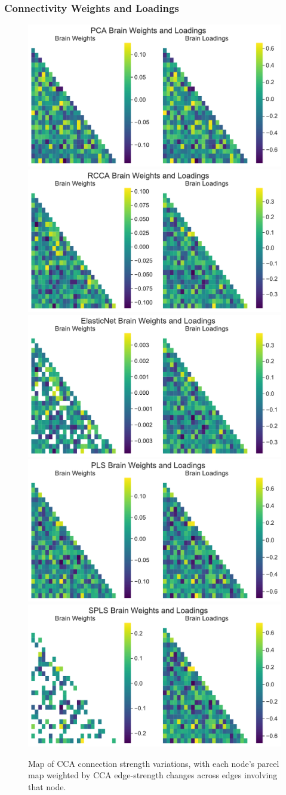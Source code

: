 \subsubsection{Connectivity Weights and Loadings}
\begin{figure}
\centering
\includegraphics[width=0.55\linewidth]{figures/regularization/hcp/PCA brain weights and loadings.pdf}
\includegraphics[width=0.55\linewidth]{figures/regularization/hcp/RCCA brain weights and loadings.pdf}
\includegraphics[width=0.55\linewidth]{figures/regularization/hcp/ElasticNet brain weights and loadings.pdf}
\includegraphics[width=0.55\linewidth]{figures/regularization/hcp/PLS brain weights and loadings.pdf}
\includegraphics[width=0.55\linewidth]{figures/regularization/hcp/SPLS brain weights and loadings.pdf}
\caption{Map of CCA connection strength variations, with each node’s parcel map weighted by CCA edge-strength changes across edges involving that node.}\label{fig:brain-connectivity}
\end{figure}

